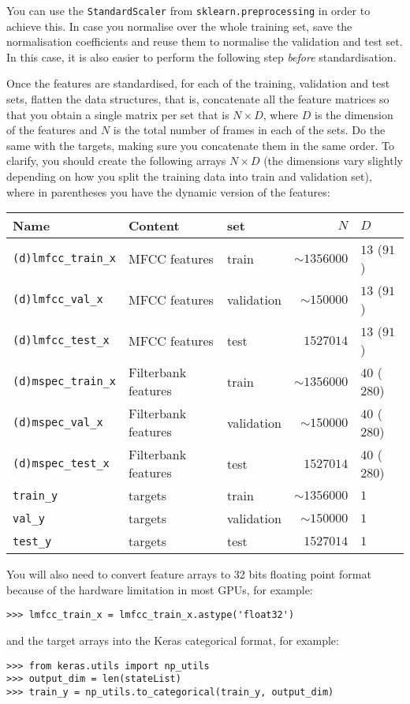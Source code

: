 \documentclass{nada-ten}
\begin{document}
You can use the \texttt{StandardScaler} from \texttt{sklearn.preprocessing} in order to achieve this.
In case you normalise over the whole training set, save the normalisation coefficients and reuse them to normalise the validation and test set. In this case, it is also easier to perform the following step \emph{before} standardisation.

Once the features are standardised, for each of the training, validation and test sets, flatten the data structures, that is, concatenate all the feature matrices so that you obtain a single matrix per set that is $N\times D$, where $D$ is the dimension of the features and $N$ is the total number of frames in each of the sets. Do the same with the targets, making sure you concatenate them in the same order. To clarify, you should create the following arrays $N\times D$ (the dimensions vary slightly depending on how you split the training data into train and validation set), where in parentheses you have the dynamic version of the features:
\begin{center}
\begin{tabular}{lllrl}
  Name & Content & set & $N$ & $D$ \\
  \hline
  \texttt{(d)lmfcc\_train\_x} & MFCC features       & train      & $\sim 1356000$ & $13$ ($91$) \\
  \texttt{(d)lmfcc\_val\_x}   & MFCC features       & validation & $\sim 150000$  & $13$ ($91$) \\
  \texttt{(d)lmfcc\_test\_x}  & MFCC features       & test       & $1527014$      & $13$ ($91$) \\
  \texttt{(d)mspec\_train\_x} & Filterbank features & train      & $\sim 1356000$ & $40$ ($280$) \\
  \texttt{(d)mspec\_val\_x}   & Filterbank features & validation & $\sim 150000$  & $40$ ($280$) \\
  \texttt{(d)mspec\_test\_x}  & Filterbank features & test       & $1527014$      & $40$ ($280$) \\
  \hline
  \texttt{train\_y}        & targets                       & train      & $\sim 1356000$ & $1$ \\
  \texttt{val\_y}          & targets                       & validation & $\sim 150000$  & $1$ \\
  \texttt{test\_y}         & targets                       & test       & $1527014$      & $1$ \\
  \hline
\end{tabular}
\end{center}
You will also need to convert feature arrays to 32 bits floating point format because of the hardware limitation in most GPUs, for example:
\begin{verbatim}
>>> lmfcc_train_x = lmfcc_train_x.astype('float32')
\end{verbatim}
and the target arrays into the Keras categorical format, for example:
\begin{verbatim}
>>> from keras.utils import np_utils
>>> output_dim = len(stateList)
>>> train_y = np_utils.to_categorical(train_y, output_dim)
\end{verbatim}
\end{document}
